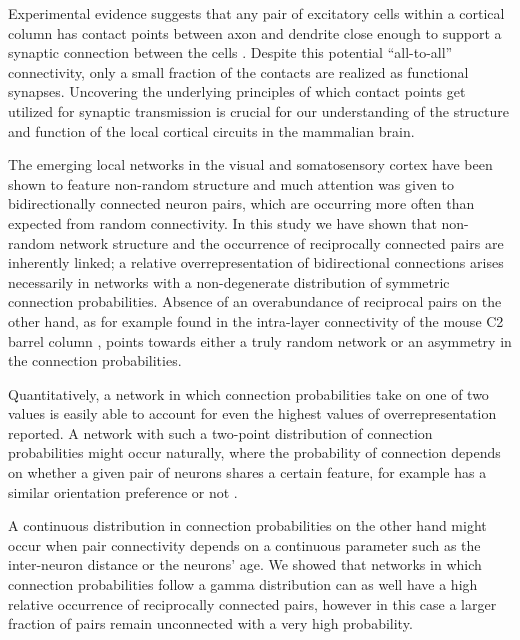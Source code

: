 

Experimental evidence suggests that any pair of excitatory cells within a cortical column has contact points between axon and dendrite close enough to support a synaptic connection between the cells \cite{Stepanyants2004,Kalisman2005}.
%
Despite this potential \enquote{all-to-all} connectivity, only a small fraction of the contacts are realized as functional synapses.
%
Uncovering the underlying principles of which contact points get utilized for synaptic transmission is crucial for our understanding of the structure and function of the local cortical circuits in the mammalian brain.


The emerging local networks in the visual and somatosensory cortex have been shown to feature non-random structure and much attention was given to bidirectionally connected neuron pairs, which are occurring more often than expected from random connectivity.
%
In this study we have shown that non-random network structure and the occurrence of reciprocally connected pairs are inherently linked; a relative overrepresentation of bidirectional connections arises necessarily in networks with a non-degenerate distribution of symmetric connection probabilities.
%
Absence of an overabundance of reciprocal pairs on the other hand, as for example found in the intra-layer connectivity of the mouse C2 barrel column \cite{Lefort2009}, points towards either a truly random network or an asymmetry in the connection probabilities. 


Quantitatively, a network in which connection probabilities take on one of two values is easily able to account for even the highest values of overrepresentation reported.
%
A network with such a two-point distribution of connection probabilities might occur naturally, where the probability of connection depends on whether a given pair of neurons shares a certain feature, for example has a similar orientation preference or not \cite{Lee2016}.


A continuous distribution in connection probabilities on the other hand might occur when pair connectivity depends on a continuous parameter such as the inter-neuron distance or the neurons' age.
%
We showed that networks in which connection probabilities follow a gamma distribution can as well have a high relative occurrence of reciprocally connected pairs, however in this case a larger fraction of pairs remain unconnected with a very high probability.



